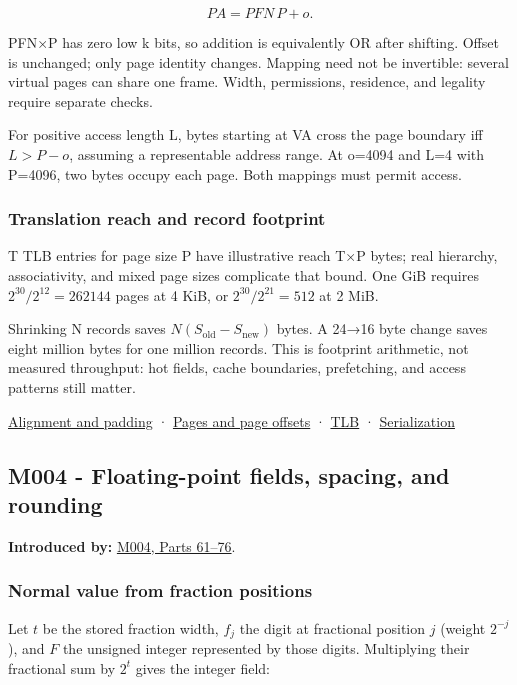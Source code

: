 \[
PA=PFN\,P+o.
\]

PFN×P has zero low k bits, so addition is equivalently OR after shifting. Offset is unchanged; only page identity changes. Mapping need not be invertible: several virtual pages can share one frame. Width, permissions, residence, and legality require separate checks.

For positive access length L, bytes starting at VA cross the page boundary iff \(L>P-o\), assuming a representable address range. At o=4094 and L=4 with P=4096, two bytes occupy each page. Both mappings must permit access.

\subsubsection{Translation reach and record footprint}\label{translation-reach-and-record-footprint}

T TLB entries for page size P have illustrative reach T×P bytes; real hierarchy, associativity, and mixed page sizes complicate that bound. One GiB requires \(2^{30}/2^{12}=262144\) pages at 4 KiB, or \(2^{30}/2^{21}=512\) at 2 MiB.

Shrinking N records saves \(N(S_{\mathrm{old}}-S_{\mathrm{new}})\) bytes. A 24→16 byte change saves eight million bytes for one million records. This is footprint arithmetic, not measured throughput: hot fields, cache boundaries, prefetching, and access patterns still matter.

\hyperref[appendix-a1f7c53b4742]{Alignment and padding} · \hyperref[appendix-0c67cd5bf30a]{Pages and page offsets} · \hyperref[appendix-7a2d9c5ce511]{TLB} · \hyperref[appendix-91d09ebed979]{Serialization}

\subsection{M004 - Floating-point fields, spacing, and rounding}\label{m004---floating-point-fields-spacing-and-rounding}

\textbf{Introduced by:} \hyperref[01-foundations-i-ch001]{M004, Parts 61--76}.

\subsubsection{Normal value from fraction positions}\label{normal-value-from-fraction-positions}

Let \(t\) be the stored fraction width, \(f_j\) the digit at fractional position \(j\) (weight \(2^{-j}\)), and \(F\) the unsigned integer represented by those digits. Multiplying their fractional sum by \(2^t\) gives the integer field:

